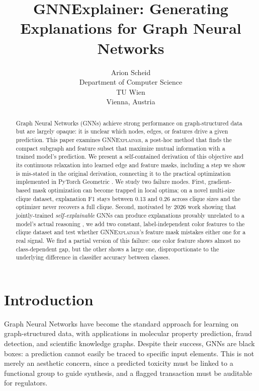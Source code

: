 \documentclass{article}
\title{GNNExplainer: Generating Explanations for Graph Neural Networks}
\author{%
  Arion Scheid\\
  Department of Computer Science\\
  TU Wien\\
  Vienna, Austria\\
}
\newcommand{\GNNEx}{\textsc{GNNExplainer}\xspace}
\theoremstyle{definition}
\begin{document}
\maketitle

\begin{abstract}
Graph Neural Networks (GNNs) achieve strong performance on graph-structured data
but are largely opaque: it is unclear which nodes, edges, or features drive a
given prediction. This paper examines \GNNEx \citep{ying2019gnnexplainer}, a
post-hoc method that finds the compact subgraph and feature subset that maximize
mutual information with a trained model's prediction. We present a
self-contained derivation of this objective and its continuous relaxation into
learned edge and feature masks, including a step we show is mis-stated in the
original derivation, connecting it to the practical optimization implemented
in PyTorch Geometric \citep{fey2019fast}. We study two failure modes. First,
gradient-based mask optimization can become trapped in local optima; on a
novel multi-size clique dataset, explanation F1 stays between 0.13 and
0.26 across clique sizes and the optimizer never recovers a full clique.
Second, motivated by 2026 work showing that jointly-trained
\emph{self-explainable} GNNs can produce explanations provably unrelated
to a model's actual reasoning \citep{azzolin2026gnnexplanations}, we add
two constant, label-independent color features to the clique dataset and
test whether \GNNEx's feature mask mistakes either one for a real signal.
We find a partial version of this failure: one color feature shows almost
no class-dependent gap, but the other shows a large one, disproportionate
to the underlying difference in classifier accuracy between classes.
\end{abstract}


\section{Introduction}

Graph Neural Networks have become the standard approach for learning on
graph-structured data, with applications in molecular property prediction,
fraud detection, and scientific knowledge graphs. Despite their success, GNNs
are black boxes: a prediction cannot easily be traced to specific input
elements. This is not merely an aesthetic concern, since a predicted
toxicity must be linked to a functional group to guide synthesis, and a
flagged transaction must be auditable for regulators.
\end{document}
